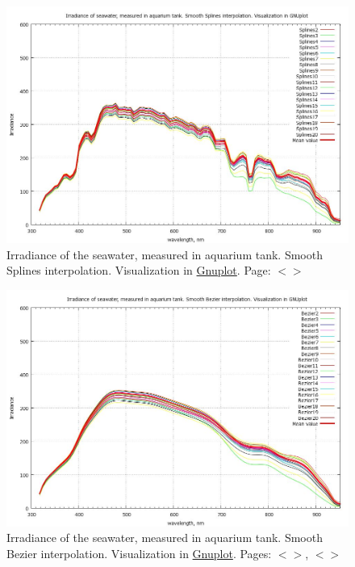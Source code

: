 \documentclass[11pt]{article}
\begin{document}
\begin{appendices}
\begin{figure}[H]
	\begin{center}
		\includegraphics[scale=0.30]{GNU-Irr-Splines.jpg}
		\caption{Irradiance of the seawater, measured in aquarium tank. Smooth Splines interpolation. Visualization in \href{http://www.gnuplot.info/}{Gnuplot}. Page: $<$\pageref{page-31}$>$­}
		\label{fig:A.17}
	\end{center}
\end{figure}
\begin{figure}[H]
	\centering
	\includegraphics[scale=0.30]{GNU-Irr.jpg}
	\caption{Irradiance of the seawater, measured in aquarium tank. Smooth Bezier interpolation. Visualization in \href{http://www.gnuplot.info/}{Gnuplot}. Pages: $<$\pageref{dataprep}$>$, $<$\pageref{page-30}$>$}
	\label{fig:A.18}
\end{figure}


\end{appendices}
\end{document}
